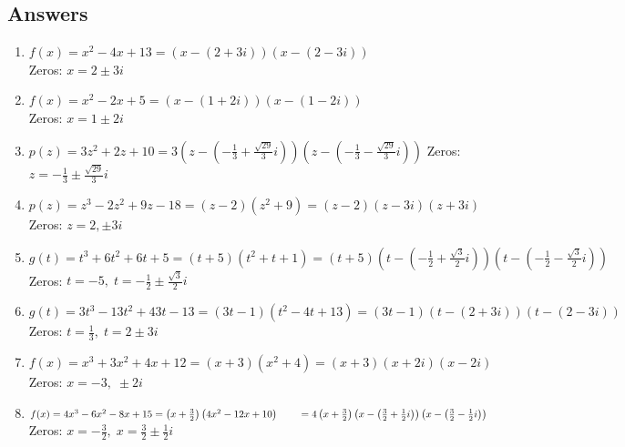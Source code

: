 \documentclass{ximera}
\begin{document}
	\author{Stitz-Zeager}


\subsection{Answers}


\begin{enumerate}


\item $f(x) = x^2-4x+13 = (x-(2+3i)) (x-(2-3i))$ \\
Zeros: $x = 2 \pm 3i$ 
\item $f(x) = x^2 - 2x + 5 = (x-(1+2i))(x-(1-2i))$ \\ 
Zeros:  $x = 1 \pm 2i$


\item $p(z) = 3z^2 + 2z +10 = 3\left(z-\left(-\frac{1}{3} + \frac{\sqrt{29}}{3} i\right) \right) \left(z-\left(-\frac{1}{3} - \frac{\sqrt{29}}{3} i\right) \right)$
Zeros:  $z = -\frac{1}{3} \pm \frac{\sqrt{29}}{3} i$
\item $p(z) = z^3-2z^2+9z-18 = (z-2) \left(z^2+9\right) = (z-2)(z-3i)(z+3i)$\\
Zeros:  $z=2, \pm 3i$

\item $g(t) = t^{3} + 6t^{2} + 6t + 5 = (t + 5)(t^{2} + t + 1) = (t + 5) \left( t - \left( -\frac{1}{2} + \frac{\sqrt{3}}{2}i \right) \right) \left( t - \left(-\frac{1}{2} - \frac{\sqrt{3}}{2}i \right) \right)$ \\
Zeros: $t = -5, \;  t = -\frac{1}{2} \pm \frac{\sqrt{3}}{2}i $
\item $g(t) = 3t^{3} - 13t^{2} + 43t - 13 = (3t - 1)(t^{2} - 4t + 13) = (3t - 1)(t - (2 + 3i))(t - (2 - 3i))$\\
Zeros: $t = \frac{1}{3}, \; t = 2 \pm 3i$



\item $f(x) = x^3 + 3x^2 + 4x + 12 = (x+3) \left(x^2 + 4 \right) = (x+3)(x+2i)(x-2i)$ \\
Zeros:  $x = -3, \; \pm 2i$
\item $f(x) = 4x^3-6x^2-8x+15 = \left(x + \frac{3}{2} \right) \left(4x^2-12x+10\right) \\
 \phantom{f(x)} = 4 \left(x + \frac{3}{2} \right) \left(x - \left( \frac{3}{2} + \frac{1}{2}i  \right) \right) \left(x - \left( \frac{3}{2} - \frac{1}{2}i  \right) \right)$\\
Zeros:  $x = - \frac{3}{2}, \; x = \frac{3}{2} \pm \frac{1}{2}i$



\end{enumerate}
\end{document}
